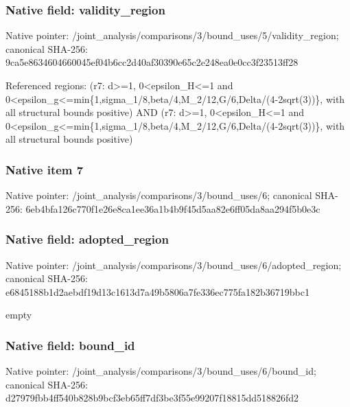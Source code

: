 \documentclass[10pt,a4paper]{article}
\begin{document}
\subsubsection{Native field: validity\_\allowbreak{}region}
Native pointer: /joint\_\allowbreak{}analysis/comparisons/3/bound\_\allowbreak{}uses/5/validity\_\allowbreak{}region; canonical SHA-256: 9ca5e8634604660045ef04b6cc2d40af30390e65c2e248ea0e0cc3f23513ff28

\begingroup\raggedright\sloppy Referenced regions:\allowbreak{} (r7:\allowbreak{} d>=\allowbreak{}1,\allowbreak{} 0<epsilon\_\allowbreak{}H<=\allowbreak{}1 and 0<epsilon\_\allowbreak{}g<=\allowbreak{}min\{1,\allowbreak{}sigma\_\allowbreak{}1/\allowbreak{}8,\allowbreak{}beta/\allowbreak{}4,\allowbreak{}M\_\allowbreak{}2/\allowbreak{}12,\allowbreak{}G/\allowbreak{}6,\allowbreak{}Delta/\allowbreak{}(4-2sqrt(3))\},\allowbreak{} with all structural bounds positive) AND (r7:\allowbreak{} d>=\allowbreak{}1,\allowbreak{} 0<epsilon\_\allowbreak{}H<=\allowbreak{}1 and 0<epsilon\_\allowbreak{}g<=\allowbreak{}min\{1,\allowbreak{}sigma\_\allowbreak{}1/\allowbreak{}8,\allowbreak{}beta/\allowbreak{}4,\allowbreak{}M\_\allowbreak{}2/\allowbreak{}12,\allowbreak{}G/\allowbreak{}6,\allowbreak{}Delta/\allowbreak{}(4-2sqrt(3))\},\allowbreak{} with all structural bounds positive)\par\endgroup

\subsubsection{Native item 7}
Native pointer: /joint\_\allowbreak{}analysis/comparisons/3/bound\_\allowbreak{}uses/6; canonical SHA-256: 6eb4bfa126c770f1e26e8ca1ee36a1b4b9f45d5aa82e6ff05da8aa294f5b0e3c

\subsubsection{Native field: adopted\_\allowbreak{}region}
Native pointer: /joint\_\allowbreak{}analysis/comparisons/3/bound\_\allowbreak{}uses/6/adopted\_\allowbreak{}region; canonical SHA-256: e6845188b1d2aebdf19d13c1613d7a49b5806a7fe336ec775fa182b36719bbc1

\begingroup\raggedright\sloppy empty\par\endgroup

\subsubsection{Native field: bound\_\allowbreak{}id}
Native pointer: /joint\_\allowbreak{}analysis/comparisons/3/bound\_\allowbreak{}uses/6/bound\_\allowbreak{}id; canonical SHA-256: d27979fbb4ff540b828b9bcf3eb65ff7df3be3f55e99207f18815dd518826fd2
\end{document}
